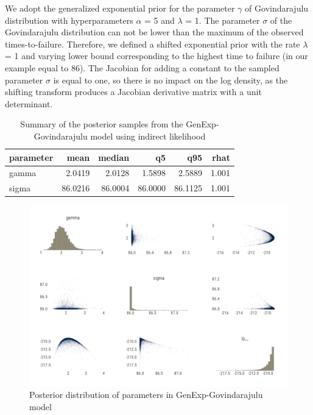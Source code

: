 \documentclass[
  12pt,
]{article}
\begin{document}
We adopt the generalized exponential prior for the parameter \(\gamma\) of Govindarajulu distribution with hyperparameters \(\alpha\) = 5 and \(\lambda\) = 1. The parameter \(\sigma\) of the Govindarajulu distribution can not be lower than the maximum of the observed times-to-failure. Therefore, we defined a shifted exponential prior with the rate \(\lambda\) = 1 and varying lower bound corresponding to the highest time to failure (in our example equal to 86). The Jacobian for adding a constant to the sampled parameter \(\sigma\) is equal to one, so there is no impact on the log density, as the shifting transform produces a Jacobian derivative matrix with a unit determinant.

\begin{table}[!h]

\caption{\label{tab:govi-tab}Summary of the posterior samples from the GenExp-Govindarajulu model using indirect likelihood}
\centering
\begin{tabular}[t]{lrrrrr}
\toprule
parameter & mean & median & q5 & q95 & rhat\\
\midrule
gamma & 2.0419 & 2.0128 & 1.5898 & 2.5889 & 1.001\\
sigma & 86.0216 & 86.0004 & 86.0000 & 86.1125 & 1.001\\
\bottomrule
\end{tabular}
\end{table}

\begin{figure}

{\centering \includegraphics[width=0.8\linewidth]{ilbm_article_files/figure-latex/govi-pairs-graph-1} 

}

\caption{Posterior distribution of parameters in GenExp-Govindarajulu model}\label{fig:govi-pairs-graph}
\end{figure}
\end{document}
